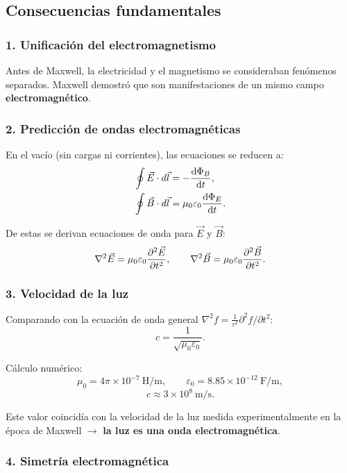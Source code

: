 \documentclass[12pt,a4paper]{article}
\begin{document}
\subsection{Consecuencias fundamentales}

\subsubsection*{1. Unificación del electromagnetismo}

Antes de Maxwell, la electricidad y el magnetismo se consideraban
fenómenos separados. Maxwell demostró que son manifestaciones de un
mismo campo \textbf{electromagnético}.

\subsubsection*{2. Predicción de ondas electromagnéticas}

En el vacío (sin cargas ni corrientes), las ecuaciones se reducen a:
\[
\begin{aligned}
\oint \vec E \cdot d\vec l &= -\dv{\Phi_B}{t}, \\
\oint \vec B \cdot d\vec l &= \mu_0 \varepsilon_0 \dv{\Phi_E}{t}.
\end{aligned}
\]

De estas se derivan ecuaciones de onda para \(\vec E\) y \(\vec B\):
\[
\nabla^2 \vec E = \mu_0 \varepsilon_0 \pdv[2]{\vec E}{t},\qquad
\nabla^2 \vec B = \mu_0 \varepsilon_0 \pdv[2]{\vec B}{t}.
\]

\subsubsection*{3. Velocidad de la luz}

Comparando con la ecuación de onda general
\(\nabla^2 f = \frac{1}{v^2} \partial^2 f / \partial t^2\):
\[
\boxed{c = \frac{1}{\sqrt{\mu_0 \varepsilon_0}}}.
\]

Cálculo numérico:
\[
\mu_0 = 4\pi \times 10^{-7}\ \text{H/m},\qquad
\varepsilon_0 = 8.85 \times 10^{-12}\ \text{F/m},
\]
\[
c \approx 3 \times 10^{8}\ \text{m/s}.
\]

Este valor coincidía con la velocidad de la luz medida
experimentalmente en la época de Maxwell
\(\rightarrow\) \textbf{la luz es una onda electromagnética}.

\subsubsection*{4. Simetría electromagnética}
\end{document}
